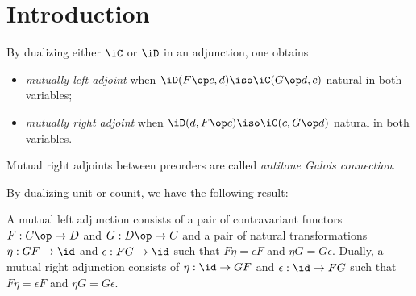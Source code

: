 \documentclass{amsart}
\title{}
\author{Frank Tsai}
\date{\today}
\begin{document}
\maketitle
\tableofcontents

\section{Introduction}
\label{sec:introduction}

\begin{defn}
  By dualizing either $\iC$ or $\iD$ in an adjunction, one obtains
  
  \begin{itemize}
  \item \emph{mutually left adjoint} when $\iD(F\op c, d) \iso \iC(G\op d, c)$ natural in both variables;
  \item \emph{mutually right adjoint} when $\iD(d, F\op c) \iso \iC(c, G\op d)$ natural in both variables. 
  \end{itemize}
\end{defn}

Mutual right adjoints between preorders are called \emph{antitone Galois connection}.

By dualizing unit or counit, we have the following result:

\begin{lem}
  A mutual left adjunction consists of a pair of contravariant functors $F : C\op \to D$ and $G : D\op \to C$ and a pair of natural transformations $\eta : GF \to \id$ and $\epsilon : FG \to \id$ such that $F\eta = \epsilon F$ and $\eta G = G\epsilon$.
  Dually, a mutual right adjunction consists of $\eta : \id \to GF$ and $\epsilon : \id \to FG$ such that $F\eta = \epsilon F$ and $\eta G = G\epsilon$.
\end{lem}
\end{document}
